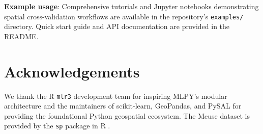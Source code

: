 \documentclass[review,12pt]{elsarticle}
\begin{document}
\textbf{Example usage}: Comprehensive tutorials and Jupyter notebooks demonstrating spatial cross-validation workflows are available in the repository's \texttt{examples/} directory. Quick start guide and API documentation are provided in the README.


\section*{Acknowledgements}

We thank the R \texttt{mlr3} development team for inspiring MLPY's modular architecture and the maintainers of scikit-learn, GeoPandas, and PySAL for providing the foundational Python geospatial ecosystem. The Meuse dataset is provided by the \texttt{sp} package in R \citep{pebesma2005classes}.




\end{document}
